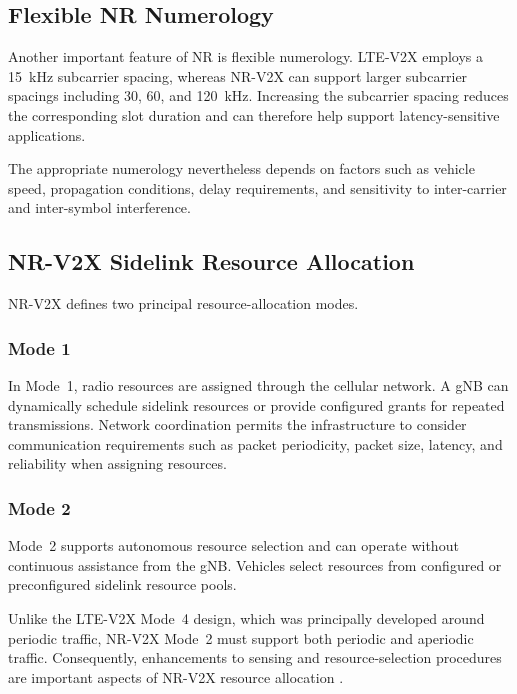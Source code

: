 \subsection{Flexible NR Numerology}

Another important feature of NR is flexible numerology. LTE-V2X employs a
15~kHz subcarrier spacing, whereas NR-V2X can support larger subcarrier
spacings including 30, 60, and 120~kHz. Increasing the subcarrier spacing
reduces the corresponding slot duration and can therefore help support
latency-sensitive applications.

The appropriate numerology nevertheless depends on factors such as vehicle
speed, propagation conditions, delay requirements, and sensitivity to
inter-carrier and inter-symbol interference.

\subsection{NR-V2X Sidelink Resource Allocation}

NR-V2X defines two principal resource-allocation modes.

\subsubsection{Mode 1}

In Mode~1, radio resources are assigned through the cellular network. A gNB
can dynamically schedule sidelink resources or provide configured grants for
repeated transmissions. Network coordination permits the infrastructure to
consider communication requirements such as packet periodicity, packet size,
latency, and reliability when assigning resources.

\subsubsection{Mode 2}

Mode~2 supports autonomous resource selection and can operate without
continuous assistance from the gNB. Vehicles select resources from configured
or preconfigured sidelink resource pools.

Unlike the LTE-V2X Mode~4 design, which was principally developed around
periodic traffic, NR-V2X Mode~2 must support both periodic and aperiodic
traffic. Consequently, enhancements to sensing and resource-selection
procedures are important aspects of NR-V2X resource allocation
\cite{ali2021mode2}.

